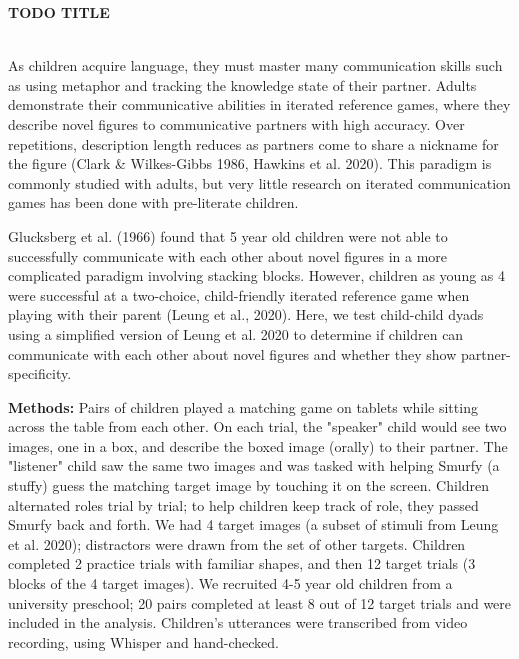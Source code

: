 \documentclass[11pt,a4paper]{article}
\renewcommand{\title}[1]{\textbf{#1}\\}
\newcommand{\authors}[1]{\iftoggle{anonymous}{\phantom{#1}}{#1}\\}
\newcommand{\email}[1]{\iftoggle{anonymous}{\phantom{#1}}{#1}}
\begin{document}


\title{TODO TITLE}
\authors{Veronica Boyce, Ilaria Chen, Bobby Sparks, Malia Perez, Michael C. Frank} 
\email{vboyce@stanford.edu;  Stanford University}
\newline
%




As children acquire language, they must master many communication skills such as using metaphor and tracking the knowledge state of their partner. Adults demonstrate their communicative abilities in iterated reference games, where they describe novel figures to communicative partners with high accuracy. Over repetitions, description length reduces as partners come to share a nickname for the figure (Clark \& Wilkes-Gibbs 1986, Hawkins et al. 2020). This paradigm is commonly studied with adults, but very little research on iterated communication games has been done with pre-literate children. 

Glucksberg et al. (1966) found that 5 year old children were not able to successfully communicate with each other about novel figures in a more complicated paradigm involving stacking blocks. However, children as young as 4 were successful at a two-choice, child-friendly iterated reference game when playing with their parent (Leung et al., 2020). Here, we test child-child dyads using a simplified version of Leung et al. 2020 to determine if children can communicate with each other about novel figures and whether they show partner-specificity. 



\textbf{Methods:} Pairs of children played a matching game on tablets while sitting across the table from each other. On each trial, the "speaker" child would see two images, one in a box, and describe the boxed image (orally) to their partner. The "listener" child saw the same two images and was tasked with helping Smurfy (a stuffy) guess the matching target image by touching it on the screen. Children alternated roles trial by trial; to help children keep track of role, they passed Smurfy back and forth. We had 4 target images (a subset of stimuli from Leung et al. 2020); distractors were drawn from the set of other targets. Children completed 2 practice trials with familiar shapes, and then 12 target trials (3 blocks of the 4 target images). We recruited 4-5 year old children from a university preschool; 20 pairs completed at least 8 out of 12 target trials and were included in the analysis. Children's utterances were transcribed from video recording, using Whisper and hand-checked. 
\end{document}
